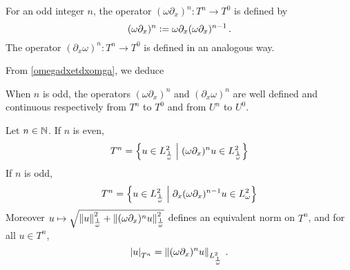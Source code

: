 \documentclass[a4paper]{article}
\begin{document}
\begin{Def}
	For an odd integer $n$, the operator $(\omega \partial_x)^n : T^n \to T^{0}$ is defined by
	\[(\omega \partial_x)^n \mathrel{\mathop:}= \omega \partial_x (\omega \partial_x)^{n-1}\,.\] 
	The operator $( \partial_x \omega)^n : T^n \to T^{0}$ is defined in an analogous way. 
\end{Def}
\noindent From \autoref{omegadxetdxomga}, we deduce 
\begin{Cor}
	\label{Lemnimpair}
	When $n$ is odd, the operators $(\omega \partial_x)^n$ and $(\partial_x \omega)^n$ are well defined and continuous respectively from $T^n$ to $T^0$ and from $U^n$ to $U^0$. 
\end{Cor}
\begin{Lem}
	Let $n \in \mathbb{N}$. If $n$ is even,
	\[T^n = \left\{ u \in L^2_\frac{1}{\omega}\mathrel{}\middle|\mathrel{}(\omega \partial_x)^n u \in L^2_\frac{1}{\omega}\right\}\]
	If $n$ is odd, 
	\[T^n = \left\{u \in L^2_\frac{1}{\omega}\mathrel{}\middle|\mathrel{}\partial_x(\omega \partial_x)^{n-1} u \in L^2_\omega\right\}\] 
	Moreover $u \mapsto \sqrt{\left\|u\right\|_\frac{1}{\omega}^2 + \left\|(\omega \partial_x)^nu\right\|^2_{\frac{1}{\omega}}}$ defines an equivalent norm on $T^n$, and for all $u \in T^n$, 
	\[\left\lvert u \right\rvert_{T^n} = \left\|(\omega \partial_x)^n u\right\|_{L^2_\frac{1}{\omega}}\,.\]
\end{Lem}
\end{document}
